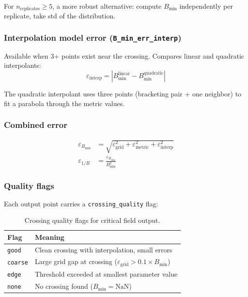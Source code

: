For $n_\text{replicates} \geq 5$, a more robust alternative: compute $B_\text{min}$ independently
per replicate, take std of the distribution.

\subsubsection{Interpolation model error (\texttt{B\_min\_err\_interp})}
\label{sec:err-interp}

Available when 3+ points exist near the crossing. Compares linear and
quadratic interpolants:
\begin{equation}
  \varepsilon_\text{interp} = |B_\text{min}^\text{linear} - B_\text{min}^\text{quadratic}|
  \label{eq:err-interp}
\end{equation}

The quadratic interpolant uses three points (bracketing pair + one neighbor)
to fit a parabola through the metric values.

\subsubsection{Combined error}
\label{sec:err-combined}

\begin{align}
  \varepsilon_{B_\text{min}} &= \sqrt{\varepsilon_\text{grid}^2 + \varepsilon_\text{metric}^2 + \varepsilon_\text{interp}^2} \label{eq:err-combined} \\
  \varepsilon_{1/B} &= \frac{\varepsilon_{B_\text{min}}}{B_\text{min}^2} \label{eq:err-inv}
\end{align}

\subsubsection{Quality flags}
\label{sec:quality-flags}

Each output point carries a \texttt{crossing\_quality} flag:

\begin{table}[htbp]
\centering
\caption{Crossing quality flags for critical field output.}
\label{tab:quality-flags}
\begin{tabular}{@{}ll@{}}
\toprule
Flag & Meaning \\
\midrule
\texttt{good}   & Clean crossing with interpolation, small errors \\
\texttt{coarse} & Large grid gap at crossing ($\varepsilon_\text{grid} > 0.1 \times B_\text{min}$) \\
\texttt{edge}   & Threshold exceeded at smallest parameter value \\
\texttt{none}   & No crossing found ($B_\text{min} = \text{NaN}$) \\
\bottomrule
\end{tabular}
\end{table}

